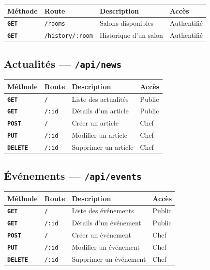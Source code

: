 \documentclass[12pt,a4paper]{article}
\newcommand{\route}[1]{\texorpdfstring{\texttt{\small\color{routeGray}#1}}{#1}}
\newcommand{\httpmethod}[1]{%
  \ifstrequal{#1}{GET}{\colorbox{blue!15}{\texttt{\bfseries\color{blue!70!black}GET}}}{}%
  \ifstrequal{#1}{POST}{\colorbox{green!18}{\texttt{\bfseries\color{green!60!black}POST}}}{}%
  \ifstrequal{#1}{PUT}{\colorbox{orange!18}{\texttt{\bfseries\color{orange!70!black}PUT}}}{}%
  \ifstrequal{#1}{DELETE}{\colorbox{red!15}{\texttt{\bfseries\color{red!70!black}DELETE}}}{}%
}
\begin{document}
\begin{center}
\begin{tabular}{l>{\raggedright\arraybackslash}p{5.6cm}>{\raggedright\arraybackslash}p{4.4cm}l}
  \toprule
  \textbf{Méthode} & \textbf{Route} & \textbf{Description} & \textbf{Accès} \\
  \midrule
  \httpmethod{GET} & \texttt{/rooms} & Salons disponibles & Authentifié \\
  \httpmethod{GET} & \texttt{/history/:room} & Historique d'un salon & Authentifié \\
  \bottomrule
\end{tabular}
\end{center}

\subsection{Actualités — \route{/api/news}}

\begin{center}
\begin{tabular}{l>{\raggedright\arraybackslash}p{5.6cm}>{\raggedright\arraybackslash}p{4.4cm}l}
  \toprule
  \textbf{Méthode} & \textbf{Route} & \textbf{Description} & \textbf{Accès} \\
  \midrule
  \httpmethod{GET} & \texttt{/} & Liste des actualités & Public \\
  \httpmethod{GET} & \texttt{/:id} & Détails d'un article & Public \\
  \httpmethod{POST} & \texttt{/} & Créer un article & Chef \\
  \httpmethod{PUT} & \texttt{/:id} & Modifier un article & Chef \\
  \httpmethod{DELETE} & \texttt{/:id} & Supprimer un article & Chef \\
  \bottomrule
\end{tabular}
\end{center}

\subsection{Événements — \route{/api/events}}

\begin{center}
\begin{tabular}{l>{\raggedright\arraybackslash}p{5.6cm}>{\raggedright\arraybackslash}p{4.4cm}l}
  \toprule
  \textbf{Méthode} & \textbf{Route} & \textbf{Description} & \textbf{Accès} \\
  \midrule
  \httpmethod{GET} & \texttt{/} & Liste des événements & Public \\
  \httpmethod{GET} & \texttt{/:id} & Détails d'un événement & Public \\
  \httpmethod{POST} & \texttt{/} & Créer un événement & Chef \\
  \httpmethod{PUT} & \texttt{/:id} & Modifier un événement & Chef \\
  \httpmethod{DELETE} & \texttt{/:id} & Supprimer un événement & Chef \\
  \bottomrule
\end{tabular}
\end{center}
\end{document}
